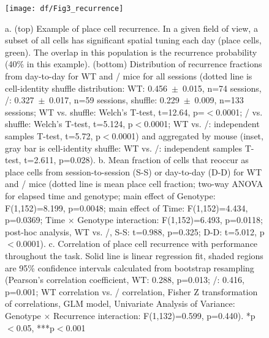 \begin{figure}
	\centering
	\texttt{[image: df/Fig3\_recurrence]}
	\caption[Comparison of recurrence probability]{a. (top) Example of place cell recurrence. In a given field of view, a subset of all cells has significant spatial tuning each day (place cells, green). The overlap in this population is the recurrence probability (40\% in this example).
	(bottom) Distribution of recurrence fractions from day-to-day for WT and \df/ mice for all sessions (dotted line is cell-identity shuffle distribution: WT: 0.456~$\pm$~0.015, n=74 sessions, \df/: 0.327~$\pm$~0.017, n=59 sessions, shuffle: 0.229~$\pm$~0.009, n=133 sessions; WT vs. shuffle: Welch's T-test, t=12.64, p=$<$0.0001; \df/ vs. shuffle: Welch's T-test, t=5.124, p$<$0.0001; WT vs. \df/: independent samples T-test, t=5.72, p$<$0.0001) and aggregated by mouse (inset, gray bar is cell-identity shuffle: WT vs. \df/: independent samples T-test, t=2.611, p=0.028). b. Mean fraction of cells that reoccur as place cells from session-to-session (S-S) or day-to-day (D-D) for WT and \df/ mice (dotted line is mean place cell fraction; two-way ANOVA for elapsed time and genotype; main effect of Genotype: F(1,152)=8.199, p=0.0048; main effect of Time: F(1,152)=4.434, p=0.0369; Time $\times$ Genotype interaction: F(1,152)=6.493, p=0.0118; post-hoc analysis, WT vs. \df/, S-S: t=0.988, p=0.325; D-D: t=5.012, p$<$0.0001). c. Correlation of place cell recurrence with performance throughout the task. Solid line is linear regression fit, shaded regions are 95\% confidence intervals calculated from bootstrap resampling (Pearson's correlation coefficient, WT: 0.288, p=0.013; \df/: 0.416, p=0.001; WT correlation vs. \df/ correlation, Fisher Z transformation of correlations, GLM model, Univariate Analysis of Variance: Genotype $\times$ Recurrence interaction: F(1,132)=0.599, p=0.440). *p$<$0.05, ***p$<$0.001}
	\label{fig:df:recurrence}
\end{figure}

